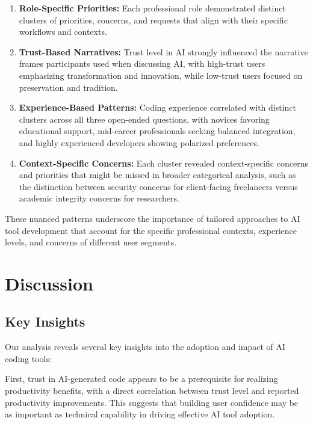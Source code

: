 \documentclass[conference]{IEEEtran}
\begin{document}
\begin{enumerate}
    \item \textbf{Role-Specific Priorities:} Each professional role demonstrated distinct clusters of priorities, concerns, and requests that align with their specific workflows and contexts.
    
    \item \textbf{Trust-Based Narratives:} Trust level in AI strongly influenced the narrative frames participants used when discussing AI, with high-trust users emphasizing transformation and innovation, while low-trust users focused on preservation and tradition.
    
    \item \textbf{Experience-Based Patterns:} Coding experience correlated with distinct clusters across all three open-ended questions, with novices favoring educational support, mid-career professionals seeking balanced integration, and highly experienced developers showing polarized preferences.
    
    \item \textbf{Context-Specific Concerns:} Each cluster revealed context-specific concerns and priorities that might be missed in broader categorical analysis, such as the distinction between security concerns for client-facing freelancers versus academic integrity concerns for researchers.
\end{enumerate}

These nuanced patterns underscore the importance of tailored approaches to AI tool development that account for the specific professional contexts, experience levels, and concerns of different user segments.

\section{Discussion}
\subsection{Key Insights}
Our analysis reveals several key insights into the adoption and impact of AI coding tools:

First, trust in AI-generated code appears to be a prerequisite for realizing productivity benefits, with a direct correlation between trust level and reported productivity improvements. This suggests that building user confidence may be as important as technical capability in driving effective AI tool adoption.
\end{document}
